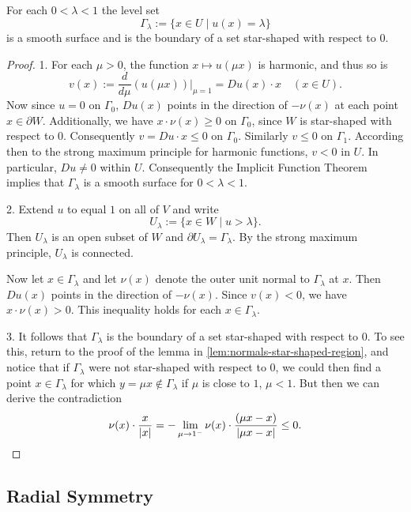 \begin{theorem}
\label{thm:star-shaped-level-sets}
For each $0 < \lambda < 1$ the level set
\[
\Gamma_\lambda := \{x \in U \mid u(x) = \lambda\}
\]
is a smooth surface and is the boundary of a set star-shaped with respect to $0$.
\end{theorem}
\begin{proof}
1. For each $\mu > 0$, the function $x \mapsto u(\mu x)$ is harmonic, and thus so is
\[
v(x) := \frac{d}{d\mu}(u(\mu x))\Big|_{\mu=1} = Du(x) \cdot x \quad (x \in U).
\]
Now since $u = 0$ on $\Gamma_0$, $Du(x)$ points in the direction of $-\nu(x)$ at each point $x \in \partial W$. Additionally, we have $x \cdot \nu(x) \geq 0$ on $\Gamma_0$, since $W$ is star-shaped with respect to $0$. Consequently $v = Du \cdot x \leq 0$ on $\Gamma_0$. Similarly $v \leq 0$ on $\Gamma_1$. According then to the strong maximum principle for harmonic functions, $v < 0$ in $U$. In particular, $Du \neq 0$ within $U$. Consequently the Implicit Function Theorem implies that $\Gamma_\lambda$ is a smooth surface for $0 < \lambda < 1$.

2. Extend $u$ to equal $1$ on all of $V$ and write
\[
U_\lambda := \{x \in W \mid u > \lambda\}.
\]
Then $U_\lambda$ is an open subset of $W$ and $\partial U_\lambda = \Gamma_\lambda$. By the strong maximum principle, $U_\lambda$ is connected.

Now let $x \in \Gamma_\lambda$ and let $\nu(x)$ denote the outer unit normal to $\Gamma_\lambda$ at $x$. Then $Du(x)$ points in the direction of $-\nu(x)$. Since $v(x) < 0$, we have $x \cdot \nu(x) > 0$. This inequality holds for each $x \in \Gamma_\lambda$.

3. It follows that $\Gamma_\lambda$ is the boundary of a set star-shaped with respect to $0$. To see this, return to the proof of the lemma in \cref{lem:normals-star-shaped-region}, and notice that if $\Gamma_\lambda$ were not star-shaped with respect to $0$, we could then find a point $x \in \Gamma_\lambda$ for which $y = \mu x \notin \Gamma_\lambda$ if $\mu$ is close to $1$, $\mu < 1$. But then we can derive the contradiction
\[
\nu(x) \cdot \frac{x}{|x|} = -\lim_{\mu \to 1^-} \nu(x) \cdot \frac{(\mu x - x)}{|\mu x - x|} \leq 0. \qedhere
\]
\end{proof}

\subsection{Radial Symmetry}
\label{sec:radial-symmetry}

